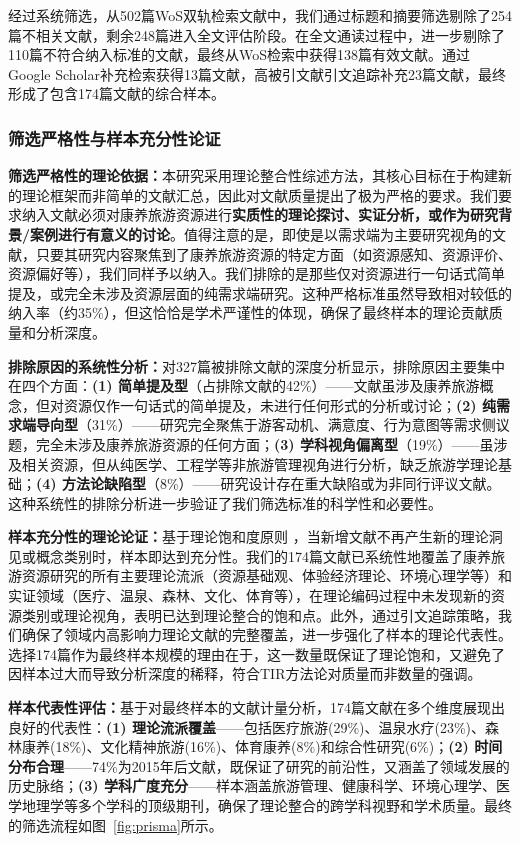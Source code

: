\documentclass[UTF8, 12pt, a4paper, twoside]{ctexart}
\begin{document}
经过系统筛选，从502篇WoS双轨检索文献中，我们通过标题和摘要筛选剔除了254篇不相关文献，剩余248篇进入全文评估阶段。在全文通读过程中，进一步剔除了110篇不符合纳入标准的文献，最终从WoS检索中获得138篇有效文献。通过Google Scholar补充检索获得13篇文献，高被引文献引文追踪补充23篇文献，最终形成了包含174篇文献的综合样本。

\subsubsection{筛选严格性与样本充分性论证}

\textbf{筛选严格性的理论依据：}本研究采用理论整合性综述方法，其核心目标在于构建新的理论框架而非简单的文献汇总，因此对文献质量提出了极为严格的要求。我们要求纳入文献必须对康养旅游资源进行\textbf{实质性的理论探讨、实证分析，或作为研究背景/案例进行有意义的讨论}。值得注意的是，即使是以需求端为主要研究视角的文献，只要其研究内容聚焦到了康养旅游资源的特定方面（如资源感知、资源评价、资源偏好等），我们同样予以纳入。我们排除的是那些仅对资源进行一句话式简单提及，或完全未涉及资源层面的纯需求端研究。这种严格标准虽然导致相对较低的纳入率（约35\%），但这恰恰是学术严谨性的体现，确保了最终样本的理论贡献质量和分析深度。

\textbf{排除原因的系统性分析：}对327篇被排除文献的深度分析显示，排除原因主要集中在四个方面：\textbf{(1) 简单提及型}（占排除文献的42\%）——文献虽涉及康养旅游概念，但对资源仅作一句话式的简单提及，未进行任何形式的分析或讨论；\textbf{(2) 纯需求端导向型}（31\%）——研究完全聚焦于游客动机、满意度、行为意图等需求侧议题，完全未涉及康养旅游资源的任何方面；\textbf{(3) 学科视角偏离型}（19\%）——虽涉及相关资源，但从纯医学、工程学等非旅游管理视角进行分析，缺乏旅游学理论基础；\textbf{(4) 方法论缺陷型}（8\%）——研究设计存在重大缺陷或为非同行评议文献。这种系统性的排除分析进一步验证了我们筛选标准的科学性和必要性。

\textbf{样本充分性的理论论证：}基于理论饱和度原则 \parencite{glaser1967discovery}，当新增文献不再产生新的理论洞见或概念类别时，样本即达到充分性。我们的174篇文献已系统性地覆盖了康养旅游资源研究的所有主要理论流派（资源基础观、体验经济理论、环境心理学等）和实证领域（医疗、温泉、森林、文化、体育等），在理论编码过程中未发现新的资源类别或理论视角，表明已达到理论整合的饱和点。此外，通过引文追踪策略，我们确保了领域内高影响力理论文献的完整覆盖，进一步强化了样本的理论代表性。选择174篇作为最终样本规模的理由在于，这一数量既保证了理论饱和，又避免了因样本过大而导致分析深度的稀释，符合TIR方法论对质量而非数量的强调。

\textbf{样本代表性评估：}基于对最终样本的文献计量分析，174篇文献在多个维度展现出良好的代表性：\textbf{(1) 理论流派覆盖}——包括医疗旅游(29\%)、温泉水疗(23\%)、森林康养(18\%)、文化精神旅游(16\%)、体育康养(8\%)和综合性研究(6\%)；\textbf{(2) 时间分布合理}——74\%为2015年后文献，既保证了研究的前沿性，又涵盖了领域发展的历史脉络；\textbf{(3) 学科广度充分}——样本涵盖旅游管理、健康科学、环境心理学、医学地理学等多个学科的顶级期刊，确保了理论整合的跨学科视野和学术质量。最终的筛选流程如图~\ref{fig:prisma}所示。
\end{document}
